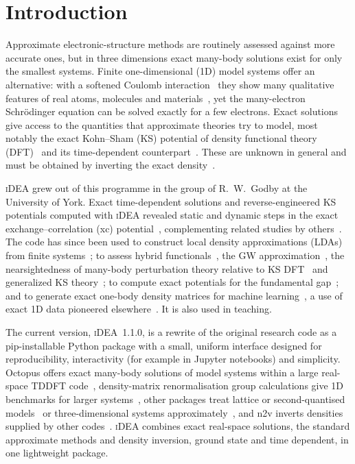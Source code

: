 \documentclass[5p,times,twocolumn]{elsarticle}
\newcommand{\iDEA}{\textsc{iDEA}}
\begin{document}
\section{Introduction}

Approximate electronic-structure methods are routinely assessed against more accurate ones, but in three dimensions exact many-body solutions exist for only the smallest systems. Finite one-dimensional (1D) model systems offer an alternative: with a softened Coulomb interaction~\cite{Javanainen1988} they show many qualitative features of real atoms, molecules and materials~\cite{Wagner2012,Baker2015,Helbig2011}, yet the many-electron Schr\"odinger equation can be solved exactly for a few electrons. Exact solutions give access to the quantities that approximate theories try to model, most notably the exact Kohn--Sham (KS) potential of density functional theory (DFT)~\cite{HK1964,KS1965} and its time-dependent counterpart~\cite{RG1984,Maitra2016,Ullrich2012}. These are unknown in general and must be obtained by inverting the exact density~\cite{vanLeeuwen1994,WangParr1993,WuYang2003,Jensen2018,Kanungo2019,Shi2022,Nielsen2013,Ruggenthaler2015}.

\iDEA{} grew out of this programme in the group of R.~W.~Godby at the University of York. Exact time-dependent solutions and reverse-engineered KS potentials computed with \iDEA{} revealed static and dynamic steps in the exact exchange--correlation (xc) potential~\cite{Ramsden2012,Hodgson2013,Hodgson2016,Hodgson2017}, complementing related studies by others~\cite{Lein2005,Elliott2012}. The code has since been used to construct local density approximations (LDAs) from finite systems~\cite{Entwistle2016,Entwistle2018}; to assess hybrid functionals~\cite{Elmaslmane2018}, the GW approximation~\cite{Wetherell2018}, the nearsightedness of many-body perturbation theory relative to KS DFT~\cite{Wetherell2019} and generalized KS theory~\cite{Hodgson2020PRA}; to compute exact potentials for the fundamental gap~\cite{Hodgson2021PRA}; and to generate exact one-body density matrices for machine learning~\cite{Wetherell2020FD}, a use of exact 1D data pioneered elsewhere~\cite{Snyder2012,Li2016}. It is also used in teaching.

The current version, \iDEA{}~1.1.0, is a rewrite of the original research code as a pip-installable Python package with a small, uniform interface designed for reproducibility, interactivity (for example in Jupyter notebooks) and simplicity. Octopus offers exact many-body solutions of model systems within a large real-space TDDFT code~\cite{Octopus2020,Helbig2011}, density-matrix renormalisation group calculations give 1D benchmarks for larger systems~\cite{Wagner2012,Baker2015}, other packages treat lattice or second-quantised models~\cite{QuSpin2017,OpenFermion2020} or three-dimensional systems approximately~\cite{PySCF2020}, and n2v inverts densities supplied by other codes~\cite{Shi2022}. \iDEA{} combines exact real-space solutions, the standard approximate methods and density inversion, ground state and time dependent, in one lightweight package.
\end{document}
